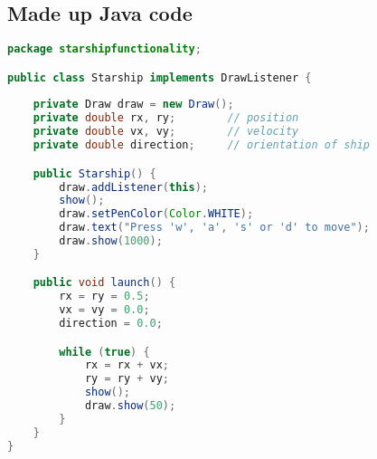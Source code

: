 \subsection{Made up Java code}


\lstset{style=mystyle}

\begin{lstlisting}[language=Java, caption=Java example]
package starshipfunctionality;

public class Starship implements DrawListener {
   
    private Draw draw = new Draw();
    private double rx, ry;        // position
    private double vx, vy;        // velocity
    private double direction;     // orientation of ship

    public Starship() {
        draw.addListener(this);
        show();
        draw.setPenColor(Color.WHITE);
        draw.text("Press 'w', 'a', 's' or 'd' to move");
        draw.show(1000);
    }

    public void launch() {
        rx = ry = 0.5;
        vx = vy = 0.0;
        direction = 0.0;

        while (true) {
            rx = rx + vx;
            ry = ry + vy;
            show();
            draw.show(50);
        }
    }
}
\end{lstlisting}